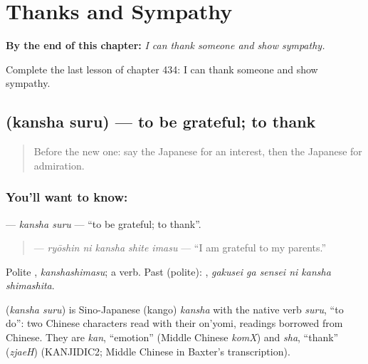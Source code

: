 
\chapter{Thanks and Sympathy}
\label{ch:ja-thanks-and-sympathy}

\begin{chapteropening}
\textbf{By the end of this chapter:} \emph{I can thank someone and show sympathy.}

Complete the last lesson of chapter 434: I can thank someone and show sympathy.
\end{chapteropening}

\section[\texorpdfstring{\ja{かんしゃする} (kansha suru)}{かんしゃする (kansha suru)}]{ (kansha suru) — to be grateful; to thank}

\label{lesson:JA-C434-kansha-suru}



\begin{quote}
Before the new one: say the Japanese for an interest, then the Japanese for admiration.
\end{quote}

\subsection*{You'll want to know: }
\textbf{} — \emph{kansha suru} — \textquotedblleft{}to be grateful; to thank\textquotedblright{}.

\begin{quote}
\textbf{ } — \emph{ryōshin ni kansha shite imasu} — \textquotedblleft{}I am grateful to my parents.\textquotedblright{}
\end{quote}

Polite \textbf{}, \emph{kanshashimasu}; a  verb. Past (polite): \textbf{  }, \emph{gakusei ga sensei ni kansha shimashita}.

\begin{cousinweb}
\textbf{} (\emph{kansha suru}) is Sino-Japanese (kango) \emph{kansha} with the native verb \emph{suru}, \textquotedblleft{}to do\textquotedblright{}: two Chinese characters read with their on'yomi, readings borrowed from Chinese. They are \emph{kan}, \textquotedblleft{}emotion\textquotedblright{} (Middle Chinese \emph{komX}) and \emph{sha}, \textquotedblleft{}thank\textquotedblright{} (\emph{zjaeH}) (KANJIDIC2; Middle Chinese in Baxter's transcription).
\end{cousinweb}

